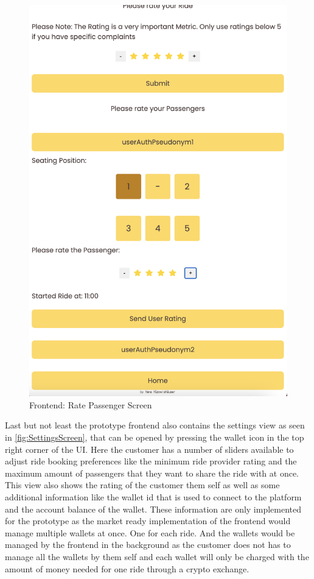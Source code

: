 \begin{figure}[H]
\begin{minipage}{0.45\linewidth}
        \includegraphics[width=\linewidth]{data/ffss/12.png}
        \caption{Frontend: Rate Passenger Screen}
        \label{fig:RatePassengerScreen}
    \end{minipage}
    
\end{figure}

Last but not least the prototype frontend  also contains the settings view as seen in \ref{fig:SettingsScreen}, that can be opened by pressing the wallet icon in the top right corner of the UI. Here the customer has a number of sliders available to adjust ride booking preferences like the minimum ride provider rating and the maximum amount of passengers that they want to share the ride with at once. This view also shows the rating of the customer them self as well as some additional information like the wallet id that is used to connect to the platform and the account balance of the wallet. These information are only implemented for the prototype as the market ready implementation of the frontend would manage multiple wallets at once. One for each ride. And the wallets would be managed by the frontend in the background as the customer does not has to manage all the wallets by them self and each wallet will only be charged with the amount of money needed for one ride through a crypto exchange.

